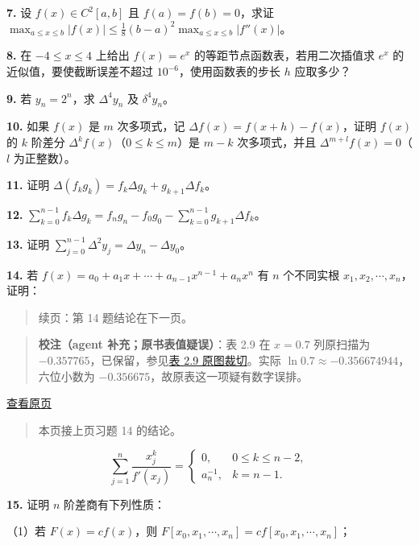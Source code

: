 \documentclass[
  10pt,
  fontset=fandol]{ctexart}
\begin{document}
\textbf{7.} 设 \(f(x)\in C^2[a,b]\) 且 \(f(a)=f(b)=0\)，求证 \(\displaystyle\max_{a\leqslant x\leqslant b}|f(x)|\leqslant\frac18(b-a)^2\max_{a\leqslant x\leqslant b}|f''(x)|\)。

\textbf{8.} 在 \(-4\leqslant x\leqslant4\) 上给出 \(f(x)=e^x\) 的等距节点函数表，若用二次插值求 \(e^x\) 的近似值，要使截断误差不超过 \(10^{-6}\)，使用函数表的步长 \(h\) 应取多少？

\textbf{9.} 若 \(y_n=2^n\)，求 \(\Delta^4y_n\) 及 \(\delta^4y_n\)。

\textbf{10.} 如果 \(f(x)\) 是 \(m\) 次多项式，记 \(\Delta f(x)=f(x+h)-f(x)\)，证明 \(f(x)\) 的 \(k\) 阶差分 \(\Delta^kf(x)\)（\(0\leqslant k\leqslant m\)）是 \(m-k\) 次多项式，并且 \(\Delta^{m+l}f(x)=0\)（\(l\) 为正整数）。

\textbf{11.} 证明 \(\Delta(f_kg_k)=f_k\Delta g_k+g_{k+1}\Delta f_k\)。

\textbf{12.} \(\displaystyle\sum_{k=0}^{n-1}f_k\Delta g_k=f_ng_n-f_0g_0-\sum_{k=0}^{n-1}g_{k+1}\Delta f_k\)。

\textbf{13.} 证明 \(\displaystyle\sum_{j=0}^{n-1}\Delta^2y_j=\Delta y_n-\Delta y_0\)。

\textbf{14.} 若 \(f(x)=a_0+a_1x+\cdots+a_{n-1}x^{n-1}+a_nx^n\) 有 \(n\) 个不同实根 \(x_1,x_2,\cdots,x_n\)，证明：

\begin{quote}
续页：第 14 题结论在下一页。
\end{quote}

\begin{quote}
\textbf{校注（agent 补充；原书表值疑误）}：表 2.9 在 \(x=0.7\) 列原扫描为 \(-0.357765\)，已保留，参见\href{../assets/ch02b/table-2-9.png}{表 2.9 原图裁切}。实际 \(\ln0.7\approx-0.356674944\)，六位小数为 \(-0.356675\)，故原表这一项疑有数字误排。
\end{quote}

\href{../../source-images/pdf-057.jpeg}{查看原页}

\begin{quote}
本页接上页习题 14 的结论。
\end{quote}

\[\sum_{j=1}^n\frac{x_j^k}{f'(x_j)}=\begin{cases}0,&0\leqslant k\leqslant n-2,\\a_n^{-1},&k=n-1.\end{cases}\]

\textbf{15.} 证明 \(n\) 阶差商有下列性质：

（1）若 \(F(x)=cf(x)\)，则 \(F[x_0,\allowbreak x_1,\allowbreak \cdots,\allowbreak x_n]=cf[x_0,\allowbreak x_1,\allowbreak \cdots,\allowbreak x_n]\)；
\end{document}
